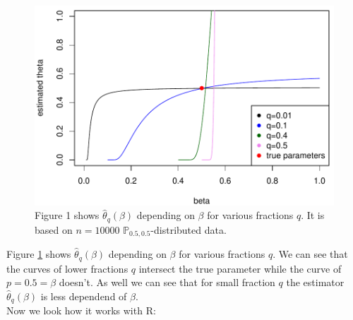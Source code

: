 \documentclass[10pt, a4paper]{article}\usepackage[]{graphicx}\usepackage[]{color}
\newenvironment{knitrout}{}{} %
\begin{document}
\begin{figure} 
\begin{knitrout}
\color{fgcolor}

{\centering \includegraphics[width=.6\linewidth]{figure/minimal-plot1_-1} 

}



\end{knitrout}
\vspace{-0.4cm}
\caption{Figure 1 shows $\hat{\theta}_q(\beta)$ depending on $\beta$ for various fractions $q$. It is based on $n=10000$ $\mathbb{P}_{0.5,0.5}$-distributed data.}
\label{fig1}
\end{figure}
Figure \ref{fig1} shows $\hat{\theta}_q(\beta)$ depending on $\beta$ for various fractions $q$. We can see that the curves of lower fractions $q$ intersect the true parameter while the curve of $p=0.5=\beta$ doesn't. As well we can see that for small fraction $q$ the estimator $\hat{\theta}_q(\beta)$ is less dependend of $\beta$.
\\
Now we look how it works with R:
\end{document}
